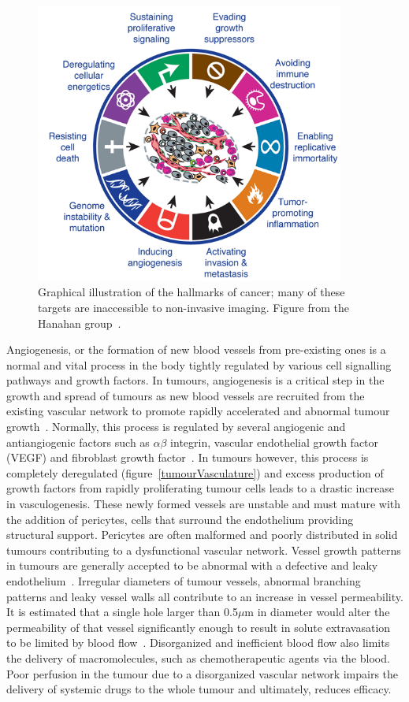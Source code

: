 \begin{figure}[htbp]   
 \begin{center}  
 \includegraphics[width=4in]{intro/./intro-images/cancerHallmarks.png}
 \caption{Graphical illustration of the hallmarks of cancer; many of these targets are inaccessible to non-invasive imaging. Figure from the Hanahan group~\cite{Hanahan:2011gu}.}  
 \label{cancerHallmarks}  
 \end{center}
\end{figure}

Angiogenesis, or the formation of new blood vessels from pre-existing ones is a normal and vital process in the body tightly regulated by various cell signalling pathways and growth factors.
In tumours, angiogenesis is a critical step in the growth and spread of tumours as new blood vessels are recruited from the existing vascular network to promote rapidly accelerated and abnormal tumour growth~\cite{Folkman:1990ud}.
Normally, this process is regulated by several angiogenic and antiangiogenic factors such as $\alpha \beta$ integrin, vascular endothelial growth factor (VEGF) and fibroblast growth factor~\cite{Laking:2006ij}.
In tumours however, this process is completely deregulated (figure~\ref{tumourVasculature}) and excess production of growth factors from rapidly proliferating tumour cells leads to a drastic increase in vasculogenesis.
These newly formed vessels are unstable and must mature with the addition of pericytes, cells that surround the endothelium providing structural support.
Pericytes are often malformed and poorly distributed in solid tumours contributing to a dysfunctional vascular network.
Vessel growth patterns in tumours are generally accepted to be abnormal with a defective and leaky endothelium~\cite{McDonald:2002ut}.
Irregular diameters of tumour vessels, abnormal branching patterns and leaky vessel walls all contribute to an increase in vessel permeability.
It is estimated that a single hole larger than 0.5$\mu$m in diameter would alter the permeability of that vessel significantly enough to result in solute extravasation to be limited by blood flow~\cite{McDonald:2002ut}.
Disorganized and inefficient blood flow also limits the delivery of macromolecules, such as chemotherapeutic agents via the blood.
Poor perfusion in the tumour due to a disorganized vascular network impairs the delivery of systemic drugs to the whole tumour and ultimately, reduces efficacy. 

